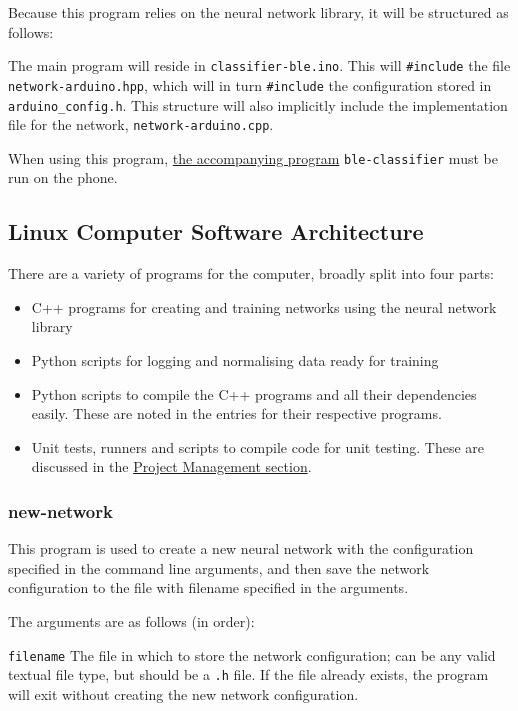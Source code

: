 \documentclass[a4paper]{article}
\begin{document}
Because this program relies on the neural network library, it will be structured as follows:

The main program will reside in \lstinline{classifier-ble.ino}. This will \lstinline{#include} the file \lstinline{network-arduino.hpp}, which will in turn \lstinline{#include} the configuration stored in \lstinline{arduino_config.h}. 
This structure will also implicitly include the implementation file for the network, \lstinline{network-arduino.cpp}.


When using this program, \hyperref[subsubsec:dc_asa_classifier]{the accompanying program} \lstinline{ble-classifier} must be run on the phone.

\subsection{Linux Computer Software Architecture}%
\label{subsec:dc_csa}

There are a variety of programs for the computer, broadly split into four parts:

\begin{itemize}
\item C++ programs for creating and training networks using the neural network library
\item Python scripts for logging and normalising data ready for training
\item Python scripts to compile the C++ programs and all their dependencies easily. These are noted in the entries for their respective programs.
\item Unit tests, runners and scripts to compile code for unit testing. These are discussed in the \hyperref[subsec:pp_testing]{Project Management section}.
\end{itemize}

\subsubsection{new-network}%
\label{subsubsec:dc_csa_newnetwork}

This program is used to create a new neural network with the configuration specified in the command line arguments, and then save the network configuration to the file with filename specified in the arguments.

The arguments are as follows (in order):

\lstinline{filename} The file in which to store the network configuration; can be any valid textual file type, but should be a \lstinline{.h} file. If the file already exists, the program will exit without creating the new network configuration.
\end{document}

